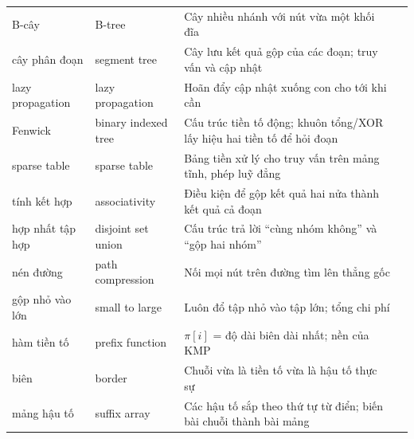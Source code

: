 \documentclass[algorithm.tex]{subfiles}
\begin{document}
\begin{center}
\begin{longtable}{@{}L{3.5cm}L{3.9cm}L{6.2cm}L{1.5cm}@{}}
B-cây & B-tree & Cây nhiều nhánh với nút vừa một khối đĩa & \\
cây phân đoạn & segment tree & Cây lưu kết quả gộp của các đoạn; truy vấn và cập nhật  & \\
lazy propagation & lazy propagation & Hoãn đẩy cập nhật xuống con cho tới khi cần & \\
Fenwick & binary indexed tree & Cấu trúc tiền tố động; khuôn tổng/XOR lấy hiệu hai tiền tố để hỏi đoạn & \\
sparse table & sparse table & Bảng tiền xử lý cho truy vấn  trên mảng tĩnh, phép luỹ đẳng & \\
tính kết hợp & associativity & Điều kiện để gộp kết quả hai nửa thành kết quả cả đoạn & \\
hợp nhất tập hợp & disjoint set union & Cấu trúc trả lời ``cùng nhóm không'' và ``gộp hai nhóm'' & \\
nén đường & path compression & Nối mọi nút trên đường tìm lên thẳng gốc & \\
gộp nhỏ vào lớn & small to large & Luôn đổ tập nhỏ vào tập lớn; tổng chi phí  & \\
hàm tiền tố & prefix function & \(\pi[i]\) = độ dài biên dài nhất; nền của KMP & \\
biên & border & Chuỗi vừa là tiền tố vừa là hậu tố thực sự & \\
mảng hậu tố & suffix array & Các hậu tố sắp theo thứ tự từ điển; biến bài chuỗi thành bài mảng & \\
\bottomrule
\end{longtable}
\end{center}
\end{document}

